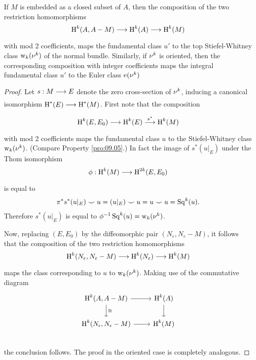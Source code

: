 \documentclass[../main]{subfiles}
\begin{document}
\begin{theorem}\label{thm:11.3}
If $M$ is embedded as a closed subset of $A$, then the composition of the two restriction homomorphisms
\[
\homology^{k}(A, A-M) \varrightarrow{} \homology^{k}(A) \varrightarrow{} \homology^{k}(M)
\]
with mod 2 coefficients, maps the fundamental class $u'$ to the top Stiefel-Whitney class $\operatorname{w}_{k}(\nu_{}^{k})$ of the normal bundle. Similarly, if $\nu_{}^k$ is oriented, then the corresponding composition with integer coefficients maps the integral fundamental class $u'$ to the Euler class $\operatorname{e}(\nu_{}^k)$
\end{theorem}

\begin{proof} 
Let $s: M \varrightarrow{} E$ denote the zero cross-section of $\nu_{}^{k}$, inducing a canonical isomorphism $\homology^{*}(E) \varrightarrow{} \homology^{*}(M)$. First note that the composition
\[
\homology^{k}(E, E_{0}) \varrightarrow{} \homology^{k}(E) \varrightarrow{s^*} \homology^{k}(M)
\]
with mod 2 coefficients maps the fundamental class $u$ to the Stiefel-Whitney class $\operatorname{w}_{k}(\nu_{}^{k})$. (Compare Property \ref{pro:09.05}.) In fact the image of $s^*(u|_E)$ under the Thom isomorphism
\[
\phi: \homology^{k}(M) \varrightarrow{} \homology^{2k}(E, E_{0})
\]
is equal to \[\pi^{*} s^{*}(u|_E) \smile u=(u|_E) \smile u=u \smile u=\operatorname{Sq}^{k}(u).\] Therefore $s^*(u|_E)$ is equal to $\phi^{-1} \operatorname{Sq}^{k}(u)=\operatorname{w}_{k}(\nu_{}^{k})$.

Now, replacing $(E,E_{0})$ by the diffeomorphic pair $(N_{\varepsilon}, N_{\varepsilon}-M)$, it follows that the composition of the two restriction homomorphisms
\[
\homology^{k}(N_{\varepsilon}, N_{\varepsilon}-M) \varrightarrow{} \homology^{k}(N_{\varepsilon}) \varrightarrow{} \homology^{k}(M)
\]
maps the class corresponding to $u$ to $\operatorname{w}_{k}(\nu_{}^{k})$. Making use of the commutative diagram
\[\begin{tikzcd}
\homology^k (A, A-M) \arrow[d, "\cong"] \arrow[r] & \homology^k (A) \arrow[d] \\
\homology^k(N_\epsilon, N_\epsilon - M) \arrow[r] & \homology^k(M) \\
\end{tikzcd}\]
the conclusion follows. The proof in the oriented case is completely analogous.
\end{proof}
\end{document}
